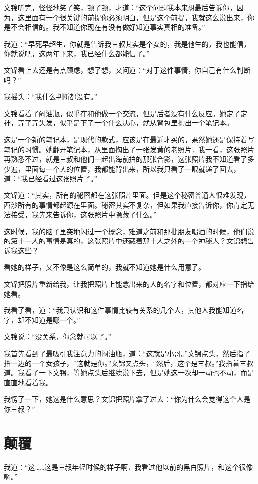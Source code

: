 文锦听完，怪怪地笑了笑，顿了顿，才道：“这个问题我本来想最后告诉你，因为，这里面有一个很关键的前提你必须明白，但是这个前提，我就这么说出来，你是不会相信的。我不知道你现在有没有做好知道事实真相的准备。”

我道：“早死早超生，你就是告诉我三叔其实是个女的，我是他生的，我也能信，你就说吧，这两年下来，我已经什么都能信了。”

文锦看上去还是有点顾虑，想了想，又问道：“对于这件事情，你自己有什么判断吗？”

我摇头：“我什么判断都没有。”

文锦看着了闷油瓶，似乎在和他做一个交流，但是后者没有什么反应。她定了定神，弄了弄头发，似乎是下了一个什么决心，就从背包里掏出一个笔记本。

这是一个新的笔记本，是现代的款式，应该是在最近才买的，果然她还是保持着写笔记的习惯。她翻开笔记本，从里面掏出了一张发黄的老照片，我一看，这张照片再熟悉不过，就是三叔和他们一起出海前拍的那张合影，这张照片我不知道看了多少遍，里面每一个人的位置，我都能背出来，所以我只看了一眼就递了回去，道：“我已经看过这张照片了。”

文锦道：“其实，所有的秘密都在这张照片里面。但是这个秘密普通人很难发现，西沙所有的事情都起源在里面。秘密其实不复杂，但如果我直接告诉你，你肯定无法接受，我先来告诉你，这张照片中隐藏了什么。”

这时候，我的脑子里突地闪过一个概念，难道之前和那批朋友喝酒的时候，他们说的第十一人的事情是真的，这张照片中还藏着那十人之外的一个神秘人？文锦想告诉我这些？

看她的样子，又不像是这么简单的，我就不知道她是什么用意了。

文锦把照片重新给我，让我把照片上能念出来的人的名字和位置，都对应一下指给她看。

我看了看，道：“我只认识和这件事情比较有关系的几个人，其他人我能知道名字，却不知道是哪一个。”

文锦说：“没关系，你念就可以了。”

我首先看到了最吸引我注意力的闷油瓶，道：“这就是小哥。”文锦点头，然后指了指一边的一个女孩子，“这就是你。”文锦又点头，“然后，这个是三叔。”我指着三叔道。我看了一下文锦，等她点头后继续说下去，但是她这一次却一动也不动，而是直直地看着我。

我愣了一下，她这是什么意思？文锦把照片拿了过去：“你为什么会觉得这个人是你三叔？”

\chapter{颠覆}

我道：“这……这是三叔年轻时候的样子啊，我看过他以前的黑白照片，和这个很像啊。”

